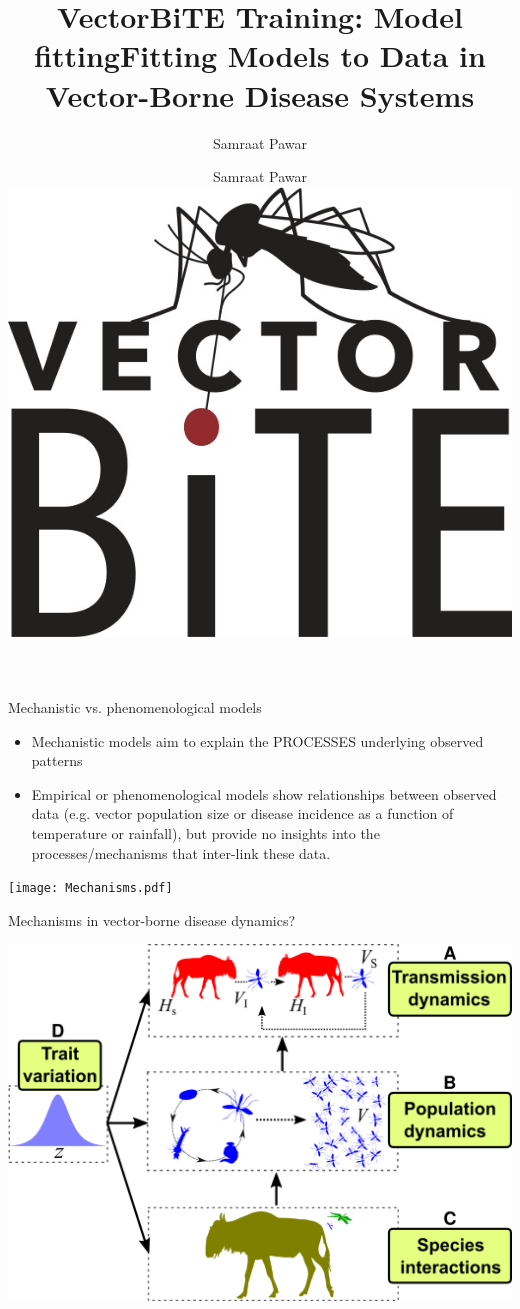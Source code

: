 \documentclass[xcolor=x11names,compress]{beamer}
\title{VectorBiTE Training: Model fitting}
\author{Samraat Pawar}
\renewcommand{\(}{\begin{columns}}
\renewcommand{\)}{\end{columns}}
\newcommand{\<}[1]{\begin{column}{#1}}
\renewcommand{\>}{\end{column}}
\begin{document}
\begin{frame}[plain]

\title{Fitting Models to Data in Vector-Borne Disease Systems}
\author{
    Samraat Pawar\\
    \vspace{20pt}
  \centering
  \includegraphics[height = .5in]{../../notebooks/graphics/VB_logo.jpg}
}
 
\titlepage
\end{frame}

\begin{frame}{Mechanistic vs. phenomenological models}

   \begin{itemize}\itemsep4pt
		 \item Mechanistic models aim to explain the PROCESSES underlying 
		 observed patterns

		\item Empirical or phenomenological models show relationships 
		between observed data (e.g. vector population size or disease incidence as a function of temperature or rainfall), but provide no insights into the processes/mechanisms that inter-link these data.
	 \end{itemize}

\pause
	
 \begin{center}
	 \texttt{[image: Mechanisms.pdf]}
 \end{center} 

\end{frame}

\begin{frame}{Mechanisms in vector-borne disease dynamics?}

\begin{center}
	\includegraphics[width=.8\textwidth]{VecTraitOverview.png}	
\end{center}

\end{frame}
	
\end{document}
